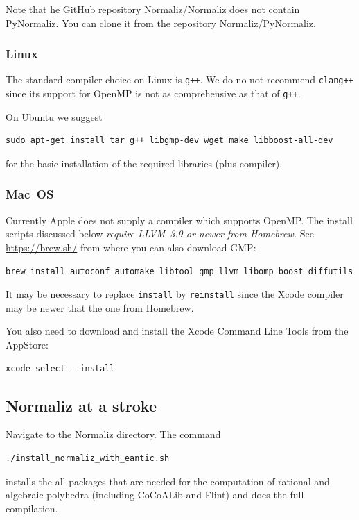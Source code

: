 Note that he GitHub repository Normaliz/Normaliz does not contain PyNormaliz. You can clone it from the repository Normaliz/PyNormaliz.

\subsubsection{Linux}
The standard compiler choice on Linux is \verb|g++|. We do no not recommend \verb|clang++| since its support for OpenMP is not as comprehensive as that of \verb|g++|.

On Ubuntu we suggest
\begin{Verbatim}
sudo apt-get install tar g++ libgmp-dev wget make libboost-all-dev
\end{Verbatim}
for the basic installation of the required libraries (plus compiler).

\subsubsection{Mac~OS}\label{mac}

Currently Apple does not supply a compiler which supports OpenMP.
The install scripts discussed below \emph{require LLVM~3.9 or newer from Homebrew.} See
\url{https://brew.sh/} from where you can also download GMP:

\begin{Verbatim}
brew install autoconf automake libtool gmp llvm libomp boost diffutils
\end{Verbatim}

It may be necessary to replace \verb|install| by \verb|reinstall| since the Xcode compiler may be newer that the one from Homebrew.

You also need to download and install the Xcode Command Line Tools from the AppStore:
\begin{Verbatim}
xcode-select --install
\end{Verbatim}

\subsection{Normaliz at a stroke}\label{stroke}

Navigate to the Normaliz directory. The command
\begin{Verbatim}
./install_normaliz_with_eantic.sh
\end{Verbatim}
installs the all packages that are needed for the computation of rational and algebraic polyhedra (including CoCoALib and Flint) and does the full compilation.

